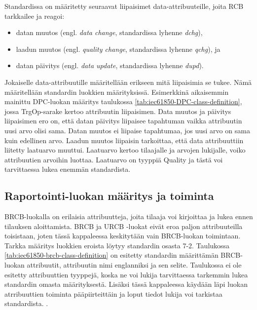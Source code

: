 Standardissa on määritetty seuraavat liipaisimet data-attribuuteille, joita RCB tarkkailee ja reagoi:
\begin{itemize}
	\item datan muutos (engl. \emph{data change}, standardissa lyhenne \emph{dchg}),
	\item laadun muutos (engl. \emph{quality change}, standardissa lyhenne \emph{qchg}), ja
	\item datan päivitys (engl. \emph{data update}, standardissa lyhenne \emph{dupd}).
\end{itemize}
Jokaiselle data-attribuutille määritellään erikseen mitä liipaisimia se tukee. Nämä määritellään standardin luokkien määrityksissä. Esimerkkinä aikaisemmin mainittu DPC-luo\-kan määritys taulukossa \ref{tab:iec61850-DPC-class-definition}, jossa TrgOp-sarake kertoo attribuutin liipaisimen. Data muutos ja päivitys liipaisimen ero on, että datan päivitys liipaisee tapahtuman vaikka attribuutin uusi arvo olisi sama. Datan muutos ei liipaise tapahtumaa, jos uusi arvo on sama kuin edellinen arvo. Laadun muutos liipaisin tarkoittaa, että data attribuuttiin liitetty laatuarvo muuttui. Laatuarvo kertoo tilaajalle ja arvojen lukijalle, voiko attribuutien arvoihin luottaa. Laatuarvo on tyyppiä Quality ja tästä voi tarvittaessa lukea enemmän standardista. \mbox{\cite[s.~90]{IEC61850-7-1}}


\subsection{Raportointi-luokan määritys ja toiminta}
\label{ch:rcb-toiminta}
BRCB-luokalla on erilaisia attribuutteja, joita tilaaja voi kirjoittaa ja lukea ennen tilauksen aloittamista. BRCB ja URCB -luokat eivät eroa paljon attribuuteilla toisistaan, joten tässä kappaleessa keskitytään vain BRCB-luokan toimintaan. Tarkka määritys luokkien eroista löytyy standardin osasta 7-2. Taulukossa \ref{tab:iec61850-brcb-class-definition} on esitetty standardin määrittämän BRCB-luokan attribuutit, attribuutin nimi englanniksi ja sen selite. Taulukossa ei ole esitetty attribuuttien tyyppejä, koska ne voi lukija tarvittaessa tarkemmin lukea standardin omasta määrityksestä. Lisäksi tässä kappaleessa käydään läpi luokan atrribuuttien toiminta pääpiirteittäin ja loput tiedot lukija voi tarkistaa standardista. \mbox{\cite[s.~93--118]{IEC61850-7-2}}.

